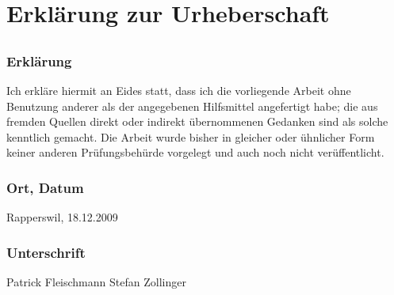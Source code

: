 \chapter{Erklärung zur Urheberschaft}
\section*{}
\subsection*{Erklärung}
Ich erkläre hiermit an Eides statt, dass ich die vorliegende Arbeit ohne
Benutzung anderer als der angegebenen Hilfsmittel angefertigt habe; die aus fremden Quellen direkt oder indirekt übernommenen Gedanken sind als solche kenntlich gemacht. Die Arbeit wurde bisher in gleicher oder ühnlicher Form keiner anderen Prüfungsbehürde vorgelegt und auch noch nicht verüffentlicht.

\subsection*{Ort, Datum}
Rapperswil, 18.12.2009

\subsection*{Unterschrift}
Patrick Fleischmann \hspace{3cm} Stefan Zollinger